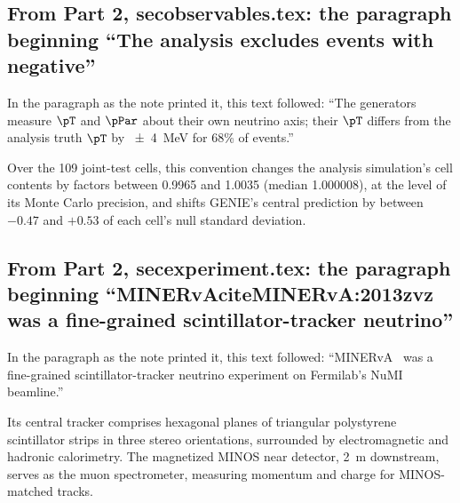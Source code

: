 \subsection{From Part 2, secobservables.tex: the paragraph beginning ``The analysis excludes events with negative''}
In the paragraph as the note printed it, this text followed: ``The generators measure $\pT$ and $\pPar$ about their own neutrino axis; their $\pT$ differs from the analysis truth $\pT$ by \SI{\pm4}{MeV} for 68\% of events.''\par
Over the 109 joint-test cells, this convention changes the analysis simulation's cell contents by factors between 0.9965 and 1.0035 (median 1.000008), at the level of its Monte Carlo precision, and shifts GENIE's central prediction by between $-0.47$ and $+0.53$ of each cell's null standard deviation.

\subsection{From Part 2, secexperiment.tex: the paragraph beginning ``MINERvAciteMINERvA:2013zvz was a fine-grained scintillator-tracker neutrino''}
In the paragraph as the note printed it, this text followed: ``MINERvA~\cite{MINERvA:2013zvz} was a fine-grained scintillator-tracker neutrino experiment on Fermilab's NuMI beamline.''\par
Its central tracker comprises hexagonal planes of triangular polystyrene scintillator strips in three stereo orientations, surrounded by electromagnetic and hadronic calorimetry. The magnetized MINOS near detector, \SI{2}{m} downstream, serves as the muon spectrometer, measuring momentum and charge for MINOS-matched tracks.

